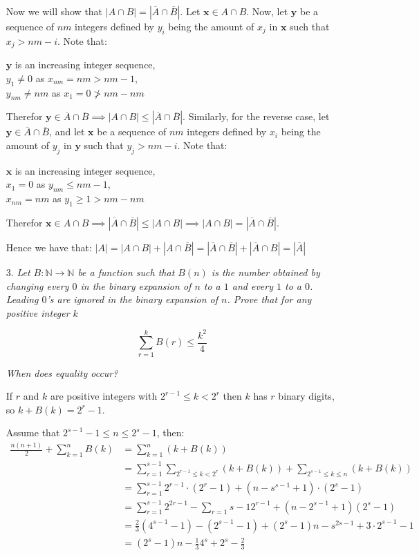 \documentclass{article}
\begin{document}
\begin{enumerate}
Now we will show that $|A\cap B| = |\overline{A}\cap\overline{B}|$.
Let $\mathbf{x} \in A\cap B$. Now, let $\mathbf{y}$ be a sequence of $nm$ integers defined by $y_i$ being the amount of $x_j$ in $\mathbf{x}$ such that $x_j > nm-i$. 
Note that:
\begin{center}
$\mathbf{y}$ is an increasing integer sequence,
\\$y_1 \neq 0$ as $x_{nm} = nm > nm-1$,
\\$y_{nm} \neq nm$ as $x_1 = 0 \ngtr nm - nm$
\end{center}
Therefor $\mathbf{y}\in\overline{A}\cap\overline{B}\implies|A\cap B|\leq |\overline{A}\cap\overline{B}|$.
Similarly, for the reverse case, let  $\mathbf{y}\in\overline{A}\cap\overline{B}$, and let $\mathbf{x}$ be a sequence of $nm$ integers defined by $x_i$ being the amount of $y_j$ in $\mathbf{y}$ such that $y_j > nm-i$.
Note that:
\begin{center}
$\mathbf{x}$ is an increasing integer sequence,
\\$x_1 = 0$ as $y_{nm} \leq nm-1$,
\\$x_{nm} = nm$ as $y_1 \geq 1 > nm - nm$
\end{center}
Therefor $\mathbf{x}\in A\cap B\implies|\overline{A}\cap\overline{B}|\leq|A\cap B| \implies |A\cap B| = |\overline{A}\cap\overline{B}|$.

Hence we have that: 
$|A| = |A\cap B| + |A\cap\overline{B}| = |\overline{A}\cap\overline{B}| + |\overline{A}\cap B| = |\overline{A}|$

\medskip
\item[3.] %
\textit{Let $B: \mathbb{N} \rightarrow \mathbb{N}$ be a function such that $B(n)$ is the number obtained by changing every $0$ in the binary expansion of $n$ to a $1$ and every $1$ to a $0$. Leading $0$'s are ignored in the binary expansion of $n$. Prove that for any positive integer $k$}

$$\sum_{r=1}^{k} B(r) \le \frac{k^2}{4}$$

\textit{When does equality occur?}

If $r$ and $k$ are positive integers with $2^{r - 1} \le k < 2^r$ then $k$ has $r$ binary digits, so $k + B(k) = 2^r - 1$.

Assume that $2^{s - 1} - 1 \le n \le 2^s - 1$, then:
\begin{align*}
\frac{n(n + 1)}{2} + \sum_{k = 1}^{n} B(k) &= \sum_{k = 1}^{n} (k + B(k)) \\
&= \sum_{r = 1}^{s - 1} \sum_{2^{r - 1} \le k < 2^r} (k + B(k)) + \sum_{2^{s - 1} \le k \le n} (k + B(k)) \\
&= \sum_{r = 1}^{s - 1} 2^{r - 1} \cdot (2^r - 1) + (n - s^{s - 1} + 1) \cdot (2^s - 1) \\
&= \sum_{r = 1}^{s - 1} 2^{2r - 1} - \sum_{r = 1}{s - 1} 2^{r - 1} + (n - 2^{s - 1} + 1)(2^s - 1) \\
&= \frac{2}{3} (4^{s - 1} - 1) - (2^{s - 1} - 1) + (2^s - 1)n - s^{2s - 1} + 3 \cdot 2^{s - 1} - 1 \\
&= (2^s - 1)n - \frac{1}{3} 4^s + 2^s - \frac{2}{3}
\end{align*}


\end{enumerate}
\end{document}

